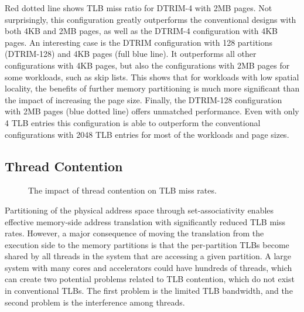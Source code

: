 Red dotted line shows TLB miss ratio for DTRIM-4 with 2MB pages. Not surprisingly, this configuration greatly outperforms the conventional designs with both 4KB and 2MB pages, as well as the DTRIM-4 configuration with 4KB pages. An interesting case is the DTRIM configuration with 128 partitions (DTRIM-128) and 4KB pages (full blue line). It outperforms all other configurations with 4KB pages, but also the configurations with 2MB pages for some workloads, such as skip lists. This shows that for workloads with low spatial locality, the benefits of further memory partitioning is much more significant than the impact of increasing the page size. Finally, the DTRIM-128 configuration with 2MB pages (blue dotted line) offers unmatched performance. Even with only 4 TLB entries this configuration is able to outperform the conventional configurations with 2048 TLB entries for most of the workloads and page sizes.


\subsection{Thread Contention}
\begin{figure}[t]
    \centering
    \caption{The impact of thread contention on TLB miss rates.}
    \label{fig:contention}
\end{figure}


Partitioning of the physical address space through set-associativity
enables effective memory-side address translation with significantly
reduced TLB miss rates.  However, a major consequence of moving the
translation from the execution side to the memory partitions is that the
per-partition TLBs become shared by all threads in the system that are
accessing a given partition. A large system with many cores and
accelerators could have hundreds of threads, which can create two
potential problems related to TLB contention, which do not exist in
conventional TLBs. The first problem is the limited TLB bandwidth, and
the second problem is the interference among threads.

